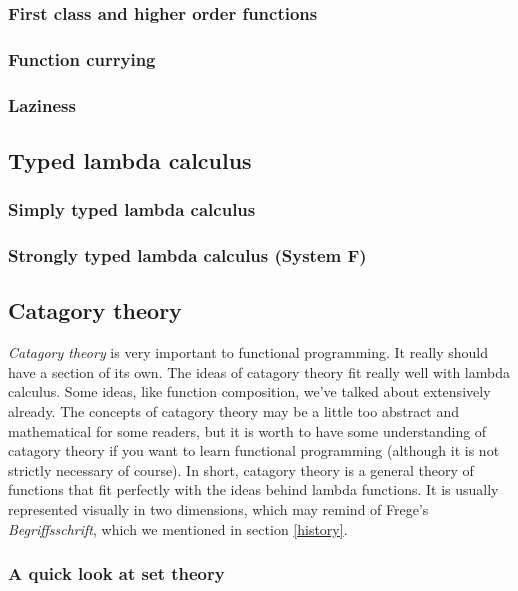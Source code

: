 \documentclass[11pt]{article}
\begin{document}
\subsubsection{First class and higher order functions}

\subsubsection{Function currying}

\subsubsection{Laziness}\label{laziness}

\subsection{Typed lambda calculus}

\subsubsection{Simply typed lambda calculus}

\subsubsection{Strongly typed lambda calculus (System F)}

\subsection{Catagory theory}

\emph{Catagory theory} is very important to functional programming. It really
should have a section of its own. The ideas of catagory theory fit really well
with lambda calculus. Some ideas, like function composition, we've talked about
extensively already. The concepts of catagory theory may be a little too
abstract and mathematical for some readers, but it is worth to have some
understanding of catagory theory if you want to learn functional programming
(although it is not strictly necessary of course). In short, catagory theory is
a general theory of functions that fit perfectly with the ideas behind lambda
functions. It is usually represented visually in two dimensions, which may
remind of Frege's \emph{Begriffsschrift}, which we mentioned in section
\ref{history}.


\subsubsection{A quick look at set theory}
\end{document}

